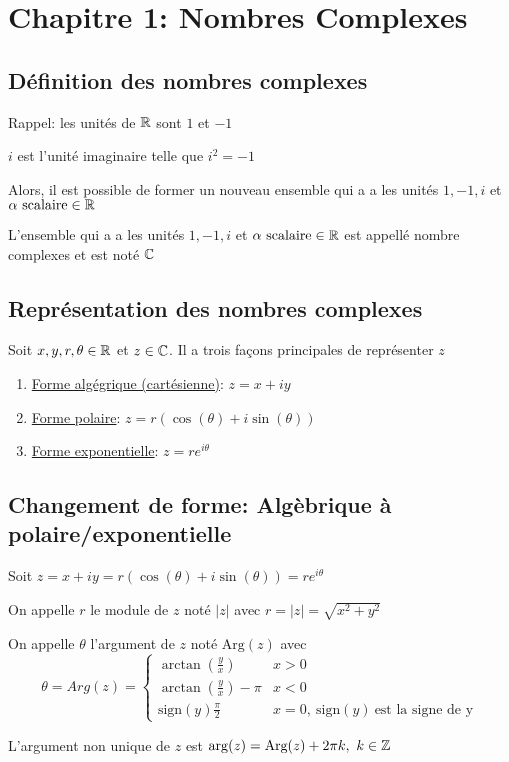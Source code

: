 \section{Chapitre 1: Nombres Complexes}

\subsection{Définition des nombres complexes}
\noindent
Rappel: les unités de $\mathbb{R}$ sont $1$ et $-1$ 
\begin{definition}
    $i$ est l'unité imaginaire telle que $i^2 = -1$ 
\end{definition}
\noindent
Alors, il est possible de former un nouveau ensemble qui a a les unités $1, -1, i$ et $\alpha \text{ scalaire} \in \mathbb{R}$
\begin{definition}
    L'ensemble qui a a les unités $1, -1, i$ et $\alpha \text{ scalaire} \in \mathbb{R}$ est appellé nombre complexes et est noté $\mathbb{C}$
\end{definition}

\subsection{Représentation des nombres complexes}
\noindent
Soit $x, y, r, \theta \in \mathbb{R}$ et $z \in \mathbb{C}$. Il a trois façons principales de représenter $z$
\begin{enumerate}[\bfseries 1)]
    \item \underline{Forme algégrique (cartésienne)}: $z = x + iy$
    \item \underline{Forme polaire}: $z = r(\cos(\theta)+i\sin(\theta))$
    \item \underline{Forme exponentielle}: $z = re^{i\theta}$
\end{enumerate}

\subsection{Changement de forme: Algèbrique à polaire/exponentielle}
\noindent
Soit $z = x + iy = r(\cos(\theta)+i\sin(\theta)) = re^{i\theta}$ 
\begin{definition}
    On appelle $r$ le module de $z$ noté $|z|$ avec $r = |z| = \sqrt{x^2 + y^2}$
\end{definition}
\begin{definition}
On appelle $\theta$ l'argument de $z$ noté $\text{Arg}(z)$ avec \[\theta = Arg(z) =
    \begin{cases}
        \arctan(\frac{y}{x})       & x > 0                            \\
        \arctan(\frac{y}{x}) - \pi & x < 0                            \\
        \text{sign}(y)\frac{\pi}{2}           & x = 0, \ \text{sign}(y) \ \text{est la signe de y}
    \end{cases}\]
\end{definition}
\begin{remark}
    L'argument non unique de $z$ est $\arg(z) = \text{Arg}(z) + 2\pi k, \ k \in \mathbb{Z}$
\end{remark}

